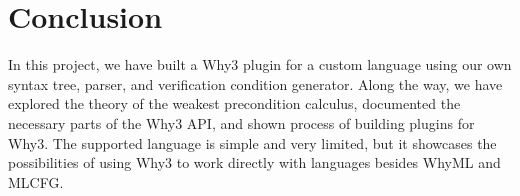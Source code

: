 \section{Conclusion} %

In this project, we have built a Why3 plugin for a custom language
using our own syntax tree, parser, and verification condition generator.
Along the way, we have explored the theory of the weakest precondition calculus,
documented the necessary parts of the Why3 API,
and shown process of building plugins for Why3.
The supported language is simple and very limited,
but it showcases the possibilities of using Why3
to work directly with languages besides WhyML and MLCFG.
